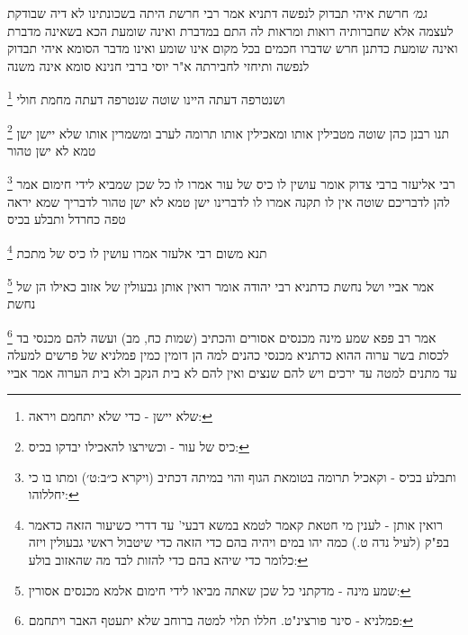 \documentclass[12pt, openany]{book}
\newcommand{\footnotecomment}[1]{
	\renewcommand\thefootnote{}
	\footnote{#1}}
\newcommand{\commenta}[1]{\footnotecomment{#1}}
\begin{document}
{{\large\emph{גמ׳}} חרשת איהי תבדוק לנפשה דתניא אמר רבי חרשת היתה בשכונתינו לא דיה שבודקת לעצמה אלא שחברותיה רואות ומראות לה 
התם במדברת ואינה שומעת הכא בשאינה מדברת ואינה שומעת כדתנן חרש שדברו חכמים בכל מקום אינו שומע ואינו מדבר
הסומא איהי תבדוק לנפשה ותיחזי לחבירתה א"ר יוסי ברבי חנינא סומא אינה משנה
\commenta{שלא יישן - כדי שלא יתחמם ויראה:}
ושנטרפה דעתה היינו שוטה שנטרפה דעתה מחמת חולי 
\commenta{כיס של עור - וכשירצו להאכילו יבדקו בכיס:}
תנו רבנן כהן שוטה מטבילין אותו ומאכילין אותו תרומה לערב ומשמרין אותו שלא יישן ישן טמא לא ישן טהור 
\commenta{ותבלע בכיס - וקאכיל תרומה בטומאת הגוף והוי במיתה דכתיב (ויקרא כ״ב:ט׳) ומתו בו כי יחללוהו:}
רבי אליעזר ברבי צדוק אומר עושין לו כיס של עור אמרו לו כל שכן שמביא לידי חימום אמר להן לדבריכם שוטה אין לו תקנה 
אמרו לו לדברינו ישן טמא לא ישן טהור לדבריך שמא יראה טפה כחרדל ותבלע בכיס 
\commenta{רואין אותן - לענין מי חטאת קאמר לטמא במשא דבעי' עד דדרי כשיעור הזאה כדאמר בפ"ק (לעיל נדה ט.) כמה יהו במים ויהיה בהם כדי הזאה כדי שיטבול ראשי גבעולין ויזה כלומר כדי שיהא בהם כדי להזות לבד מה שהאזוב בולע:}
תנא משום רבי אלעזר אמרו עושין לו כיס של מתכת 
\commenta{שמע מינה - מדקתני כל שכן שאתה מביאו לידי חימום אלמא מכנסים אסורין:}
אמר אביי ושל נחשת כדתניא רבי יהודה אומר רואין אותן גבעולין של אזוב כאילו הן של נחשת 
\commenta{פמלניא - סינר פורצינ"ט. חללו תלוי למטה ברוחב שלא יתעטף האבר ויתחמם:}
אמר רב פפא שמע מינה מכנסים אסורים והכתיב (שמות כח, מב) ועשה להם מכנסי בד לכסות בשר ערוה 
ההוא כדתניא מכנסי כהנים למה הן דומין כמין פמלניא של פרשים למעלה עד מתנים למטה עד ירכים ויש להם שנצים ואין להם לא בית הנקב ולא בית הערוה 
אמר אביי}
\end{document}
